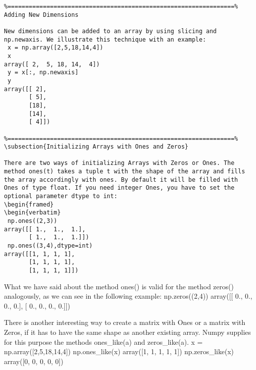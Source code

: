 \begin{framed}
\begin{verbatim}
%================================================================%
Adding New Dimensions

New dimensions can be added to an array by using slicing and np.newaxis. We illustrate this technique with an example:
 x = np.array([2,5,18,14,4])
 x
array([ 2,  5, 18, 14,  4])
 y = x[:, np.newaxis]
 y
array([[ 2],
       [ 5],
       [18],
       [14],
       [ 4]])

%================================================================%
\subsection{Initializing Arrays with Ones and Zeros}

There are two ways of initializing Arrays with Zeros or Ones. The method ones(t) takes a tuple t with the shape of the array and fills the array accordingly with ones. By default it will be filled with Ones of type float. If you need integer Ones, you have to set the optional parameter dtype to int:
\begin{framed}
\begin{verbatim}
 np.ones((2,3))
array([[ 1.,  1.,  1.],
       [ 1.,  1.,  1.]])
 np.ones((3,4),dtype=int)
array([[1, 1, 1, 1],
       [1, 1, 1, 1],
       [1, 1, 1, 1]])
\end{verbatim}
\end{framed}
What we have said about the method ones() is valid for the method zeros() analogously, as we can see in the following example:
 np.zeros((2,4))
array([[ 0.,  0.,  0.,  0.],
       [ 0.,  0.,  0.,  0.]])

There is another interesting way to create a matrix with Ones or a matrix with Zeros, if it has to have the same shape as another existing array. Numpy supplies for this purpose the methods ones_like(a) and zeros_like(a).
 x = np.array([2,5,18,14,4])
 np.ones_like(x)
array([1, 1, 1, 1, 1])
 np.zeros_like(x)
array([0, 0, 0, 0, 0])




